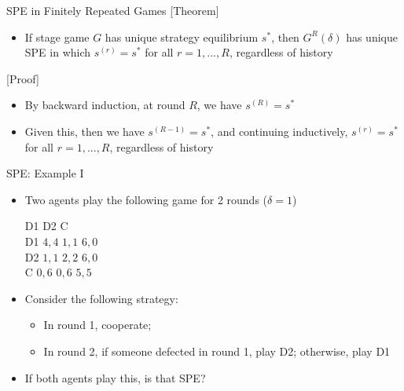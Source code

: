 \documentclass[11pt,aspectratio=169,handout]{beamer}
\begin{document}
  \begin{frame}{SPE in Finitely Repeated Games}
   \alert{[Theorem]}
   \begin{itemize}
    \item If stage game $G$ has unique strategy equilibrium $s^{*}$, then $G^{R}(\delta)$ has unique SPE in which $s^{(r)} =s^{*} $ for all $r = 1, ..., R$, regardless of history
   \end{itemize}
   \vspace{1em}   
   \alert{[Proof]}
   \begin{itemize}
    \item By backward induction, at round $R$, we have $s^{(R)} = s^{*}$
    \item Given this, then we have $s^{(R - 1)} = s^{*}$, and continuing inductively, $s^{(r)} = s^{*}$ for all $r = 1, ..., R$, regardless of history
   \end{itemize}
  \end{frame}

  \begin{frame}{SPE: Example I}
   \begin{itemize}[<+->]
    \item Two agents play the following game for 2 rounds ($\delta = 1$)
    \begin{center}
     \hspace{-3.5em}
     \begin{game}{3}{3}
      		\> D1		\> D2		\> C			\\
      D1		\> $4, 4$	\> $1, 1$	\> $6, 0$	\\
      D2		\> $1, 1$	\> $2, 2$	\> $6, 0$	\\
      C		\> $0, 6$	\> $0, 6$	\> $5, 5$
     \end{game}
    \end{center}
    \vspace{0.7em}  
    \item Consider the following strategy:
    \begin{itemize}[<.->]
     \item In round 1, cooperate;
     \item In round 2, if someone defected in round 1, play D2; otherwise, play D1
    \end{itemize}
    \item If both agents play this, is that SPE?
   \end{itemize}
  \end{frame}  
 
\end{document}
